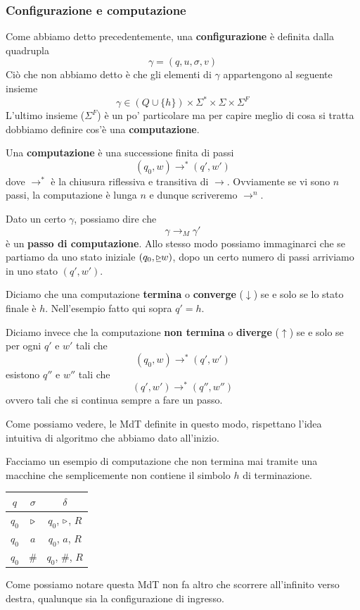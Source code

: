 \subsubsection{Configurazione e computazione}
Come abbiamo detto precedentemente, una \textbf{configurazione}
è definita dalla quadrupla
\[ \gamma = (q, u, \sigma, v) \]
Ciò che non abbiamo detto è che gli elementi di $\gamma$
appartengono al seguente insieme
\[
	\gamma \in (Q \cup \{ h \}) \times
	\Sigma^* \times \Sigma \times \Sigma^F
\]
L'ultimo insieme ($\Sigma^F$) è un po' particolare ma per
capire meglio di cosa si tratta dobbiamo definire cos'è una
\textbf{computazione}.

\begin{definition}
	Una \textbf{computazione} è una successione finita di
	passi
	\[ (q_0, w) \to^* (q', w') \]
	dove $\to^*$ è la chiusura riflessiva e transitiva di
	$\to$. Ovviamente se vi sono $n$ passi, la computazione
	è lunga $n$ e dunque scriveremo $\to^n$.
\end{definition}
Dato un certo $\gamma$, possiamo dire che
\[ \gamma \to_M \gamma' \]
è un \textbf{passo di computazione}. Allo stesso modo possiamo
immaginarci che se partiamo da uno stato iniziale
$(q_0, \underline{\triangleright} w)$, dopo un certo numero di passi
arriviamo in uno stato $(q', w')$.

\begin{definition}
	Diciamo che una computazione \textbf{termina} o
	\textbf{converge} ($\downarrow$) se e solo se lo stato
	finale è $h$. Nell'esempio fatto qui sopra $q' = h$.

	Diciamo invece che la computazione \textbf{non termina}
	o \textbf{diverge} ($\uparrow$) se e solo se per ogni
	$q'$ e $w'$ tali che
	\[ (q_0, w) \to^* (q', w') \]
	esistono $q''$ e $w''$ tali che
	\[ (q', w') \to^* (q'', w'') \]
	ovvero tali che si continua sempre a fare un passo.
\end{definition}
Come possiamo vedere, le MdT definite in questo modo,
rispettano l'idea intuitiva di algoritmo che abbiamo dato
all'inizio.

\begin{example}
	Facciamo un esempio di computazione che non termina mai
	tramite una macchine che semplicemente non contiene il
	simbolo $h$ di terminazione.
	\begin{center}
		\begin{tabular}{|c|c|c|}
			\hline
			$q$   & $\sigma$ & $\delta$             \\
			\hline
			$q_0$ & $\triangleright$ & $q_0$, $\triangleright$, $R$ \\
			$q_0$ & $a$      & $q_0$, $a$, $R$      \\
			$q_0$ & $\#$     & $q_0$, $\#$, $R$     \\
			\hline
		\end{tabular}
	\end{center}
	Come possiamo notare questa MdT non fa altro che scorrere
	all'infinito verso destra, qualunque sia la configurazione
	di ingresso.
\end{example}

